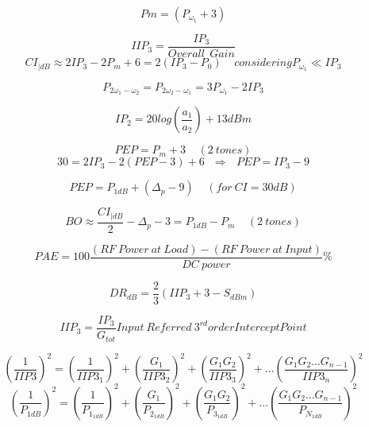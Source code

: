 \begin{equation}
Pm =(P_{\omega_1}+3)
\end{equation}

\begin{equation}
	\label{eq:iip3}
	IIP_3= \frac{IP_3}{Overall \ \ Gain}
\end{equation}
\begin{equation}
	CI_{|dB} \approx 2IP_3 - 2P_m +6= 2(IP_3-P_0) \ \ \ \ \ considering P_{\omega_1} \ll IP_3
\end{equation}

\begin{equation}
	P_{2\omega_{1}-\omega_{2}}=P_{2\omega_{2}-\omega_{1}}=3P_{\omega_1}-2IP_3
\end{equation}

\begin{equation}
	IP_2= 20log\left(\frac{a_1}{a_2}\right)+13dBm
\end{equation}

\begin{equation}
	\label{eq:pep}
	PEP = P_m +3  \ \ \ \ \ (2 \ tones) 
\end{equation}
\begin{equation}
	30= 2IP_3-2(PEP-3)+6 \ \ \ \Longrightarrow \ \ \ PEP= IP_3-9 
\end{equation}

\begin{equation}
	PEP= P_{1dB} + (\Delta_p -9 )   \ \ \ \ \ (for \  CI=30dB)
\end{equation}

\begin{equation}
	BO\approx \frac{CI_{|dB}}{2}-\Delta_p-3= P_{1dB}-P_m \ \ \ \ \ (2  \ tones)
\end{equation}

\begin{equation}
	PAE= 100\frac{(RF \ Power \ at \ Load)- (RF \ Power \ at \ Input)}{DC \ power}\%
\end{equation}

\begin{equation}
DR_{dB}= \frac{2}{3}(IIP_3+3-S_{dBm})	
\end{equation}

\begin{equation}
	IIP_3=\frac{IP_3}{G_{tot}} Input \ Referred \ 3^{rd} order Intercept Point
\end{equation}

\begin{equation}
\left ( \frac {1} {IIP3} \right)^2 = \left( \frac {1} {IIP3_1}  \right)^2 + \left( \frac{G_1}{IIP3_2}  \right)^2 + \left( \frac {G_1G_2} {IIP3_3}  \right)^2 + ...\left( \frac {G_1G_2...G_{n-1}} {IIP3_n}  \right)^2
\end{equation}
\begin{equation}
\left ( \frac {1} {P_{1dB}} \right)^2 = \left( \frac {1} {P_{1_{1dB}}}  \right)^2 + \left( \frac{G_1}{P_{2_{1dB}}}  \right)^2 + \left( \frac {G_1G_2} {P_{3_{1dB}}}  \right)^2 + ...\left( \frac {G_1G_2...G_{n-1}} {P_{N_{1dB}}}  \right)^2
\end{equation}